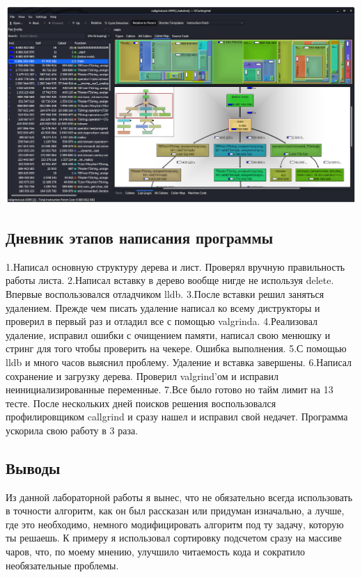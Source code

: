 \documentclass[12pt]{article}
\begin{document}
\includegraphics[width=\linewidth]{callgrind}



\subsection*{Дневник этапов написания программы}

1.Написал основную структуру дерева и лист. Проверял вручную правильность работы листа.
2.Написал вставку в дерево вообще нигде не используя delete. Впервые воспользовался отладчиком lldb.
3.После вставки решил заняться удалением. Прежде чем писать удаление написал ко всему диструкторы и проверил в первый раз и отладил все с помощью valgrinda.
4.Реализовал удаление, исправил ошибки с очищением памяти, написал свою менюшку и стринг для того чтобы проверить на чекере. Ошибка выполнения.
5.С помощью lldb и много часов выяснил проблему. Удаление и вставка завершены.
6.Написал сохранение и загрузку дерева. Проверил valgrind'ом и исправил неинициализированные переменные.
7.Все было готово но тайм лимит на 13 тесте. После нескольких дней поисков решения воспользовался профилировщиком 
callgrind и сразу нашел и исправил свой недачет. Программа ускорила свою работу в 3 раза.


\subsection*{Выводы}

Из данной лабораторной работы я вынес, что не обязательно всегда использовать в точности алгоритм, 
как он был рассказан или придуман изначально, а лучше, где это необходимо, немного модифицировать 
алгоритм под ту задачу, которую ты решаешь. К примеру я использовал сортировку подсчетом сразу на
массиве чаров, что, по моему мнению, улучшило читаемость кода и сократило необязательные проблемы.
\end{document}

